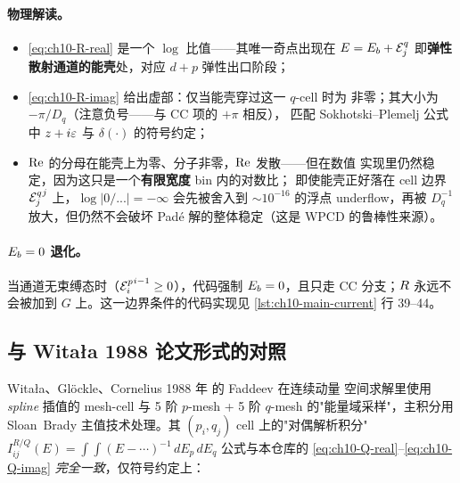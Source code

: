 \paragraph{物理解读。}
\begin{itemize}
  \item \cref{eq:ch10-R-real} 是一个 \(\log\) 比值——其唯一奇点出现在
        \(E = E_b + {\mathcal{E}_{j}^{q}}\) 即\textbf{弹性散射通道的能壳}处，对应
        \(d+p\) 弹性出口阶段；
  \item \cref{eq:ch10-R-imag} 给出虚部：仅当能壳穿过这一 \(q\)-cell 时为
        非零；其大小为 \(-\pi/D_q\)（注意负号——与 CC 项的 \(+\pi\) 相反），
        匹配 Sokhotski--Plemelj 公式中 \(z + i\varepsilon\) 与
        \(\delta(\cdot)\) 的符号约定；
  \item \(\operatorname{Re}\) 的分母在能壳上为零、分子非零，\(\operatorname{Re}\) 发散——但在数值
        实现里仍然稳定，因为这只是一个\textbf{有限宽度} bin 内的对数比；
        即使能壳正好落在 cell 边界 \({\mathcal{E}_{j}^{q}}^{j}\) 上，\(\log|0/...| = -\infty\)
        会先被舍入到 \(\sim 10^{-16}\) 的浮点 underflow，再被 \(D_q^{-1}\)
        放大，但仍然不会破坏 Padé 解的整体稳定（这是 WPCD 的鲁棒性来源）。
\end{itemize}

\paragraph{\(E_b = 0\) 退化。}
当通道无束缚态时（\({\mathcal{E}_{i}^{p}}^{i-1} \geq 0\)），代码强制 \(E_b = 0\)，且只走
CC 分支；\(R\) 永远不会被加到 \(G\) 上。这一边界条件的代码实现见
\cref{lst:ch10-main-current} 行 39--44。

\subsection{与 Witała 1988 论文形式的对照}
\label{subsec:ch10-Witala-comparison}

Witała、Glöckle、Cornelius 1988 年 \cite{Witala1988} 的 Faddeev 在连续动量
空间求解里使用 \emph{spline} 插值的 mesh-cell 与 5 阶 \(p\)-mesh + 5 阶
\(q\)-mesh 的"能量域采样"，主积分用 Sloan~Brady 主值技术处理。其
\((p_i, q_j)\) cell 上的"对偶解析积分"
\(I^{R/Q}_{ij}(E) = \int\!\int (E - \cdots)^{-1}\, dE_p\, dE_q\)
公式与本仓库的 \cref{eq:ch10-Q-real}--\cref{eq:ch10-Q-imag} \emph{完全一致}，仅符号约定上：

